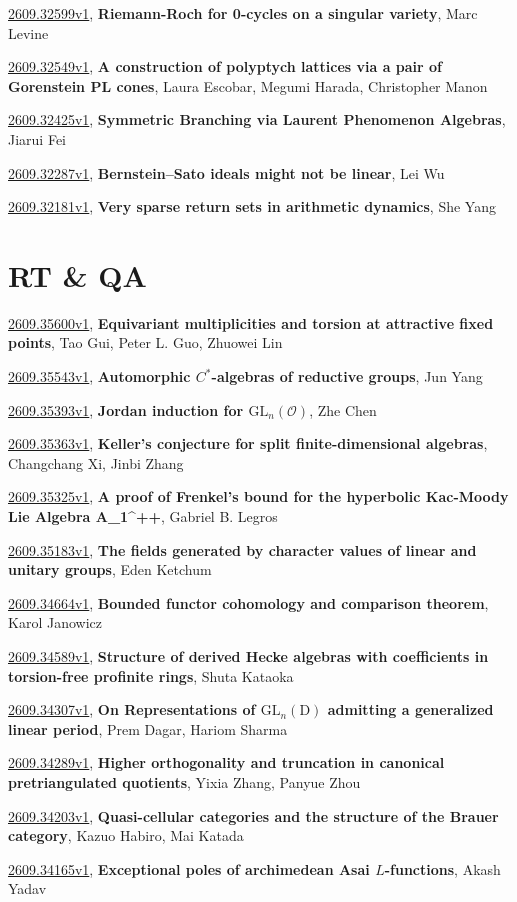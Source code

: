 \documentclass[9pt, a4paper]{article}
\theoremstyle{plain}
\theoremstyle{definition}
\theoremstyle{remark}
\newcommand{\arxiv}[3]{\href{https://arxiv.org/abs/#1}{#1}, \textbf{\textcolor{arxivblue}{#2}}, #3}
\begin{document}
\arxiv{2609.32599v1}{Riemann-Roch for 0-cycles on a singular variety}{Marc Levine}

\arxiv{2609.32549v1}{A construction of polyptych lattices via a pair of Gorenstein PL cones}{Laura Escobar, Megumi Harada, Christopher Manon}

\arxiv{2609.32425v1}{Symmetric Branching via Laurent Phenomenon Algebras}{Jiarui Fei}

\arxiv{2609.32287v1}{Bernstein--Sato ideals might not be linear}{Lei Wu}

\arxiv{2609.32181v1}{Very sparse return sets in arithmetic dynamics}{She Yang}


\section{RT \& QA}
\arxiv{2609.35600v1}{Equivariant multiplicities and torsion at attractive fixed points}{Tao Gui, Peter L. Guo, Zhuowei Lin}

\arxiv{2609.35543v1}{Automorphic $C^*$-algebras of reductive groups}{Jun Yang}

\arxiv{2609.35393v1}{Jordan induction for $\mathrm{GL}_n(\mathcal{O})$}{Zhe Chen}

\arxiv{2609.35363v1}{Keller's conjecture for split finite-dimensional algebras}{Changchang Xi, Jinbi Zhang}

\arxiv{2609.35325v1}{A proof of Frenkel's bound for the hyperbolic Kac-Moody Lie Algebra A_1^++}{Gabriel B. Legros}

\arxiv{2609.35183v1}{The fields generated by character values of linear and unitary groups}{Eden Ketchum}

\arxiv{2609.34664v1}{Bounded functor cohomology and comparison theorem}{Karol Janowicz}

\arxiv{2609.34589v1}{Structure of derived Hecke algebras with coefficients in torsion-free profinite rings}{Shuta Kataoka}

\arxiv{2609.34307v1}{On Representations of $\mathrm{GL}_n(\mathrm{D})$ admitting a generalized linear period}{Prem Dagar, Hariom Sharma}

\arxiv{2609.34289v1}{Higher orthogonality and truncation in canonical pretriangulated quotients}{Yixia Zhang, Panyue Zhou}

\arxiv{2609.34203v1}{Quasi-cellular categories and the structure of the Brauer category}{Kazuo Habiro, Mai Katada}

\arxiv{2609.34165v1}{Exceptional poles of archimedean Asai $L$-functions}{Akash Yadav}
\end{document}
